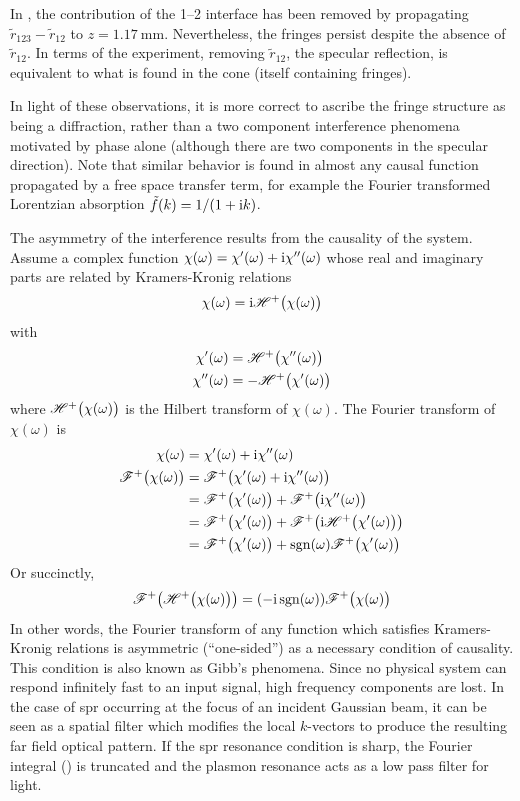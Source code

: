 In , the contribution of the 1--2 interface has been
removed by propagating $\tilde{r}_{123}-\tilde{r}_{12}$ to
$z=\SI{1.17}{\milli\meter}$.  Nevertheless, the fringes persist despite the
absence of $\tilde{r}_{12}$.  In terms of the experiment, removing
$\tilde{r}_{12}$, the specular reflection, is equivalent to what is found in
the cone (itself containing fringes).

In light of these observations, it is more correct to ascribe the fringe
structure as being a diffraction, rather than a two component interference
phenomena motivated by phase alone (although there are two components in the
specular direction).  Note that similar behavior is found in almost any causal
function propagated by a free space transfer term, for example the Fourier
transformed Lorentzian absorption $\tilde{f}(k) = 1/(1+{\mathrm{i}} k)$.

The asymmetry of the interference results from the causality of the system.
Assume a complex function $\chi(\omega) = \chi'(\omega) + {\mathrm{i}} \chi''(\omega)$
whose real and imaginary parts are related by Kramers-Kronig relations
\begin{align}
  \chi(\omega)={\mathrm{i}} {\mathscr{H}^{+}\bigl(\chi(\omega)\bigr)}
\end{align}
with
\begin{align}
  \chi'(\omega)  & = {\mathscr{H}^{+}\bigl(\chi''(\omega)\bigr)} \\
  \chi''(\omega) & = -{\mathscr{H}^{+}\bigl(\chi'(\omega)\bigr)}
\end{align}
where ${\mathscr{H}^{+}\bigl(\chi(\omega)\bigr)}$ is the Hilbert transform of $\chi(\omega)$.
The Fourier transform of $\chi(\omega)$ is
\begin{align}
  \chi(\omega)      & = \chi'(\omega) + {\mathrm{i}} \chi''(\omega)                   \\
  {\mathscr{F}^{+}\bigl(\chi(\omega)\bigr)} & = {\mathscr{F}^{+}\bigl(\chi'(\omega) + {\mathrm{i}} \chi''(\omega)\bigr)}              \\
                    & = {\mathscr{F}^{+}\bigl(\chi'(\omega)\bigr)} + {\mathscr{F}^{+}\bigl({\mathrm{i}} \chi''(\omega)\bigr)}         \\
                    & = {\mathscr{F}^{+}\bigl(\chi'(\omega)\bigr)} + {\mathscr{F}^{+}\bigl({\mathrm{i}} {\mathscr{H}^{+}\bigl(\chi'(\omega)\bigr)}\bigr)}     \\
                    & = {\mathscr{F}^{+}\bigl(\chi'(\omega)\bigr)} + \operatorname{sgn}(\omega) {\mathscr{F}^{+}\bigl(\chi'(\omega)\bigr)} \\
\end{align}
Or succinctly,
\begin{align}
  {\mathscr{F}^{+}\bigl({\mathscr{H}^{+}\bigl(\chi(\omega)\bigr)}\bigr)} = (-{\mathrm{i}} \operatorname{sgn}(\omega)) {\mathscr{F}^{+}\bigl(\chi(\omega)\bigr)}
\end{align}
In other words, the Fourier transform of any function which satisfies
Kramers-Kronig relations is asymmetric (``one-sided'') as a necessary
condition of causality.  This condition is also known as Gibb's phenomena.
Since no physical system can respond infinitely fast to an input signal, high
frequency components are lost.  In the case of \gls{spr} occurring at the focus of
an incident Gaussian beam, it can be seen as a spatial filter which modifies
the local $k$-vectors to produce the resulting far field optical pattern.  If
the \gls{spr} resonance condition is sharp, the Fourier integral
() is truncated and the plasmon resonance acts as a
low pass filter for light.
